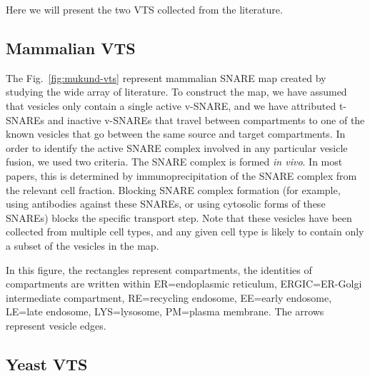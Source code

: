 Here we will present the two VTS collected from the literature.

\subsection{Mammalian VTS}


The Fig.~\ref{fig:mukund-vts} represent mammalian SNARE map
created by studying the wide array of literature.
% 
To construct the map, we have assumed that vesicles only contain a
single active v-SNARE, and we have attributed t-SNAREs and inactive
v-SNAREs that travel between compartments to one of the known vesicles
that go between the same source and target compartments.
%
In order to identify the active SNARE complex involved in any
particular vesicle fusion, we used two criteria.
%
The SNARE complex is formed \textit{in vivo}. In most papers, this is
determined by immunoprecipitation of the SNARE complex from the
relevant cell fraction.
%
Blocking SNARE complex formation (for example, using antibodies
against these SNAREs, or using cytosolic forms of these SNAREs) blocks
the specific transport step.
%
Note that these vesicles have been collected from multiple cell types, and
any given cell type is likely to contain only a subset of the vesicles in
the map.

In this figure, the rectangles represent compartments, the identities
of compartments are written within ER=endoplasmic reticulum,
ERGIC=ER-Golgi intermediate compartment, RE=recycling endosome,
EE=early endosome, LE=late endosome, LYS=lysosome, PM=plasma
membrane. The arrows represent vesicle edges.




\subsection{Yeast VTS}

